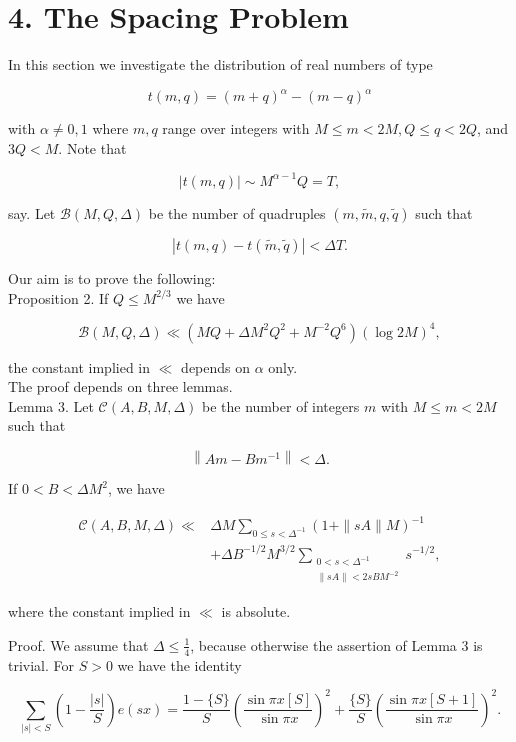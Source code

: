 \documentclass[10pt]{article}
\begin{document}
\section*{4. The Spacing Problem}
In this section we investigate the distribution of real numbers of type

$$
t(m, q)=(m+q)^{\alpha}-(m-q)^{\alpha}
$$

with $\alpha \neq 0,1$ where $m, q$ range over integers with $M \leqslant m<2 M, Q \leqslant q<2 Q$, and $3 Q<M$. Note that

$$
|t(m, q)| \sim M^{\alpha-1} Q=T,
$$

say. Let $\mathscr{B}(M,Q,\Delta)$ be the number of quadruples $(m, \tilde{m}, q, \tilde{q})$ such that


\begin{equation*}
|t(m, q)-t(\tilde{m}, \tilde{q})|<\Delta T . \tag{4.1}
\end{equation*}


Our aim is to prove the following:\\
Proposition 2. If $Q \leqslant M^{2 / 3}$ we have


\begin{equation*}
\mathscr{B}(M,Q,\Delta)\ll\left(MQ+\Delta M^{2}Q^{2}+M^{-2}Q^{6}\right)(\log 2 M)^{4}, \tag{4.2}
\end{equation*}


the constant implied in $\ll$ depends on $\alpha$ only.\\
The proof depends on three lemmas.\\
Lemma 3. Let $\mathscr{C}(A,B,M,\Delta)$ be the number of integers $m$ with
$M\leqslant m<2M$ such that

$$
\left\|Am-Bm^{-1}\right\|<\Delta.
$$

If $0<B<\Delta M^{2}$, we have

$$
\begin{aligned}
\mathscr{C}(A,B,M,\Delta)\ll{}&
\Delta M\sum_{0\leqslant s<\Delta^{-1}}(1+\|sA\|M)^{-1}\\
&+\Delta B^{-1/2}M^{3/2}
\sum_{\substack{0<s<\Delta^{-1}\\
\|sA\|<2sBM^{-2}}}s^{-1/2},
\end{aligned}
$$

where the constant implied in $\ll$ is absolute.

Proof. We assume that $\Delta\leqslant\frac14$, because otherwise the
assertion of Lemma 3 is trivial. For $S>0$ we have the identity

$$
\sum_{|s|<S}\left(1-\frac{|s|}{S}\right)e(sx)
=\frac{1-\{S\}}{S}\left(\frac{\sin \pi x[S]}{\sin \pi x}\right)^{2}
+\frac{\{S\}}{S}\left(\frac{\sin \pi x[S+1]}{\sin \pi x}\right)^{2}.
$$
\end{document}
